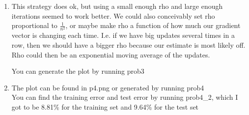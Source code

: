 \documentclass[11pt]{article}
\begin{document}
\begin{enumerate}
\item
This strategy does ok, but using a small enough rho and large enough iterations seemed to work better. We could also conceivably set rho proportional to $\frac{1}{n^2}$, or maybe make rho a function of how much our gradient vector is changing each time. I.e. if we have big updates several times in a row, then we should have a bigger rho because our estimate is most likely off. Rho could then be an exponential moving average of the updates.

You can generate the plot by running prob3
\item
The plot can be found in p4.png or generated by running prob4\\
You can find the training error and test error by running prob4\_2, which I got to be 8.81\% for the training set and 9.64\% for the test set
\end{enumerate}
\end{document}
